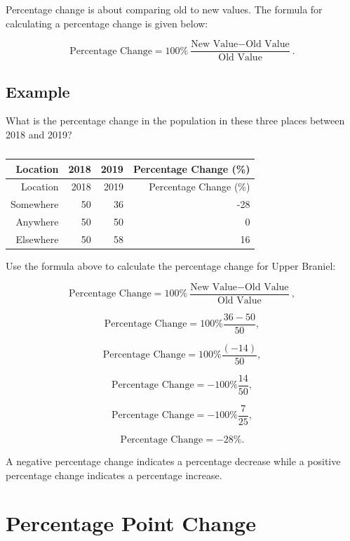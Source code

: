 \documentclass[
]{book}
\begin{document}
Percentage change is about comparing old to new values. The formula for calculating a percentage change is given below:

\[ \textrm{Percentage Change} = 100\% \frac{\textrm{New Value} - \textrm{Old Value}}{\textrm{Old Value}}.\]

\hypertarget{example-12}{%
\subsection{Example}\label{example-12}}

What is the percentage change in the population in these three places between 2018 and 2019?

\begin{longtable}[]{@{}rrrr@{}}
\caption{\label{tab:table10}}\tabularnewline
\toprule
Location & 2018 & 2019 & Percentage Change (\%) \\
\midrule
\endfirsthead
\toprule
Location & 2018 & 2019 & Percentage Change (\%) \\
\midrule
\endhead
Somewhere & 50 & 36 & -28 \\
Anywhere & 50 & 50 & 0 \\
Elsewhere & 50 & 58 & 16 \\
\bottomrule
\end{longtable}

Use the formula above to calculate the percentage change for Upper Braniel:

\[ \textrm{Percentage Change} = 100\% \frac{\textrm{New Value} - \textrm{Old Value}}{\textrm{Old Value}},\]

\[ \textrm{Percentage Change} = 100\% \frac{36 - 50}{50},\]

\[ \textrm{Percentage Change} = 100\% \frac{(-14)}{50},\]

\[ \textrm{Percentage Change} = -100\% \frac{14}{50},\]

\[ \textrm{Percentage Change} = -100\% \frac{7}{25},\]

\[ \textrm{Percentage Change} = -28\%.\]

A negative percentage change indicates a percentage decrease while a positive percentage change indicates a percentage increase.

\hypertarget{percentage-point-change}{%
\section{Percentage Point Change}\label{percentage-point-change}}
\end{document}
